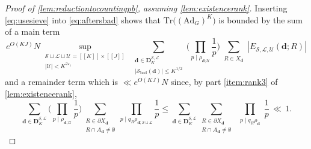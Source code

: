 \documentclass[11pt]{amsart}
\theoremstyle{definition}
\renewcommand{\leq}{\leqslant}
\newcommand{\sinterval}[1]{[\![#1]\!] }
\newcommand{\abs}[1]{\left|#1\right|}
\newcommand{\eps}{\varepsilon}
\newcommand{\Ad}{\mathrm{Ad}}
\newcommand{\Tr}{\mathrm{Tr}}
\renewcommand{\d}{\boldsymbol{d}}
\newcommand{\cstU}{2\eps_1}
\newcommand{\graph}{G}
\newcommand{\fprod}[1]{\rho_{#1}}
\newcommand{\pall}{\fprod{\d}}
\newcommand{\progression}{A_{\d}}
\newcommand{\lit}{\mathcal{L}}
\newcommand{\unlit}{\mathcal{U}}
\newcommand{\s}{\mathcal{S}}
\newcommand{\fancyD}{\mathbf{D}}
\newcommand{\Dss}{\fancyD^{\s,\lit}_{\!\repK}}
\newcommand{\modulus}{q}
\newcommand{\Xd}{X_{\d}}
\newcommand{\repR}{J}
\newcommand{\repK}{K}
\newcommand{\newK}{\sinterval{K}}
\newcommand{\newR}{\sinterval{J}}
\newcommand{\kbad}{\s_{\mathrm{bad}}(\d)}
\newcommand{\newerKR}{\newK\times\newR}
\begin{document}
\begin{proof}[Proof of \cref{lem:reductiontocountingpb}, assuming \cref{lem:existencerank}]
Inserting \cref{eq:usesieve} into \cref{eq:aftersbad} shows that $\Tr \big((\Ad_{\graph})^{\repK}\big)$ is bounded by the sum of a main term
\begin{equation}
\label{eq:maintermincomputation}
e^{O(\repK \repR)} N \sup_{\substack{\s\sqcup \lit\sqcup \unlit = \newerKR\\ |\unlit| <\repK^{\cstU}}}\, \sum_{\substack{\d\in \Dss \\ |{\kbad}| \leq\repK^{1/2}}}\!\!\Bigg(\prod_{p\mid \fprod{\d; \unlit}} \frac{1}{p}\Bigg)\sum_{\substack{R\in \Xd}}\abs{E_{\s,\lit,\unlit}(\d; R)}
\end{equation}
and a remainder term which is $\ll e^{O(\repK \repR)} N$ since, by part \cref{item:rank3} of \cref{lem:existencerank},
\begin{equation*}
\sum_{\d\in \Dss} \Bigg(\prod_{p\mid \fprod{\d; \unlit}} \frac{1}{p}\Bigg) \sum_{\substack{R\in \partial\Xd \\ R\cap \progression \neq \emptyset}}  \prod_{p\mid \modulus_{R} \fprod{\d; \s \sqcup \lit}} \frac{1}{p}
\leq\sum_{\d\in \Dss} \sum_{\substack{R\in \partial\Xd \\ R\cap \progression \neq \emptyset}} \, \prod_{\substack{p\mid \modulus_{R} \pall}}\frac{1}{p}\, \ll\, 1.
\end{equation*}


\end{proof}
\end{document}
